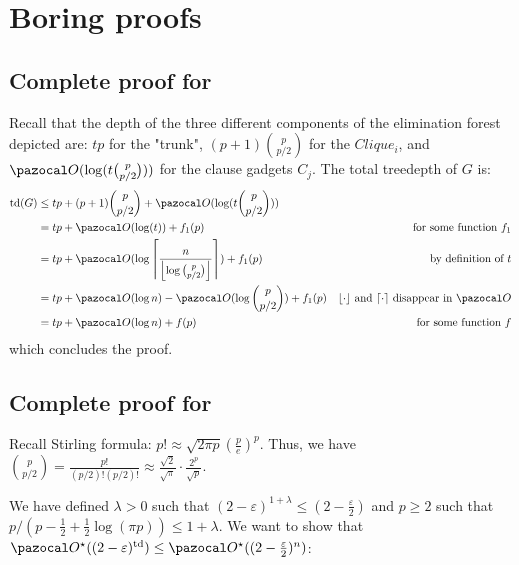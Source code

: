 \section{Boring proofs}
\label{appendix:boring-proofs}

\subsection*{Complete proof for }

Recall that the depth of the three different components of the elimination forest depicted  are: $tp$ for the "trunk", $(p+1)\binom{p}{p/2}$ for the $Clique_i$, and $\O(\log(t\binom{p}{p/2}))$ for the clause gadgets $C_j$. The total treedepth of $G$ is:
\begin{align*}
    \td(G) &\leq tp + (p+1)\binom{p}{p/2} + \O(\log(t\binom{p}{p/2}))\\
    &= tp + \O(\log(t)) + f_1(p) & \text{for some function $f_1$}\\
    &= tp + \O(\log \left\lceil\frac{n}{\left\lfloor\log\binom{p}{p/2}\right\rfloor}\right\rceil) + f_1(p) & \text{by definition of $t$}\\
    &= tp + \O(\log n) - \O(\log\binom{p}{p/2}) + f_1(p) & \text{$\lfloor\cdot\rfloor$ and $\lceil\cdot\rceil$ disappear in $\O$}\\
    &= tp + \O(\log n) + f(p) & \text{for some function $f$}
\end{align*}
which concludes the proof.

\subsection*{Complete proof for }

Recall Stirling formula: $p! \approx \sqrt{2\pi p}\left(\frac{p}{e}\right)^p$. Thus, we have $\binom{p}{p/2} = \frac{p!}{(p/2)!(p/2)!}\approx \frac{\sqrt{2}}{\sqrt{\pi}}\cdot\frac{2^p}{\sqrt{p}}$.

We have defined $\lambda > 0$ such that $(2-\varepsilon)^{1 + \lambda} \leq (2 - \frac{\varepsilon}{2})$ and $p \geq 2$ such that $p/(p - \frac{1}{2} + \frac{1}{2}\log(\pi p)) \leq 1 + \lambda$. We want to show that $\O^\star((2-\varepsilon)^\td) \leq \O^\star((2-\frac{\varepsilon}{2})^n)$:

